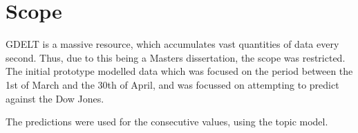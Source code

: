 \section{Scope}
GDELT is a massive resource, which accumulates vast quantities of data every second. Thus, due to this being a Masters dissertation, the scope was restricted. The initial prototype modelled data which was focused on the period between the 1st of March and the 30th of April, and was focussed on attempting to predict against the Dow Jones.

The predictions were used for the consecutive values, using the topic model.